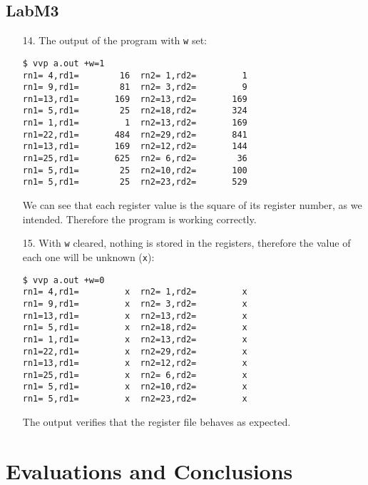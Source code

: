 \documentclass{article}
\begin{document}
\subsection{LabM3}
\begin{enumerate}
\item[14. ] The output of the program with \verb$w$ set:
\begin{verbatim}
$ vvp a.out +w=1
rn1= 4,rd1=        16  rn2= 1,rd2=         1
rn1= 9,rd1=        81  rn2= 3,rd2=         9
rn1=13,rd1=       169  rn2=13,rd2=       169
rn1= 5,rd1=        25  rn2=18,rd2=       324
rn1= 1,rd1=         1  rn2=13,rd2=       169
rn1=22,rd1=       484  rn2=29,rd2=       841
rn1=13,rd1=       169  rn2=12,rd2=       144
rn1=25,rd1=       625  rn2= 6,rd2=        36
rn1= 5,rd1=        25  rn2=10,rd2=       100
rn1= 5,rd1=        25  rn2=23,rd2=       529
\end{verbatim}
  We can see that each register value is the square of its register
number, as we intended. Therefore the program is working correctly.

\item[15. ] With \verb$w$ cleared, nothing is stored in the registers,
therefore the value of each one will be unknown (\verb$x$):
\begin{verbatim}
$ vvp a.out +w=0
rn1= 4,rd1=         x  rn2= 1,rd2=         x
rn1= 9,rd1=         x  rn2= 3,rd2=         x
rn1=13,rd1=         x  rn2=13,rd2=         x
rn1= 5,rd1=         x  rn2=18,rd2=         x
rn1= 1,rd1=         x  rn2=13,rd2=         x
rn1=22,rd1=         x  rn2=29,rd2=         x
rn1=13,rd1=         x  rn2=12,rd2=         x
rn1=25,rd1=         x  rn2= 6,rd2=         x
rn1= 5,rd1=         x  rn2=10,rd2=         x
rn1= 5,rd1=         x  rn2=23,rd2=         x
\end{verbatim}
The output verifies that the register file behaves as expected.
\end{enumerate}


\section{Evaluations and Conclusions}


\end{document}
